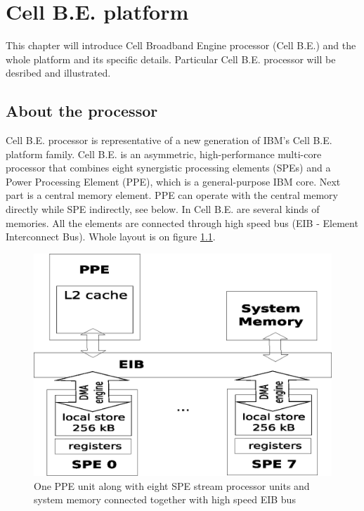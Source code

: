 \chapter{Cell B.E. platform}

This chapter will introduce Cell Broadband Engine processor (Cell B.E.) and the whole platform and its specific details.
Particular Cell B.E. processor will be desribed and illustrated.

\section{About the processor}

Cell B.E. processor is representative of a new generation of IBM's Cell B.E. platform family.
Cell B.E. is an asymmetric, high-performance multi-core processor that combines eight synergistic processing elements (SPEs) and a Power Processing Element (PPE), which is a general-purpose IBM  core.
Next part is a central memory element.
PPE can operate with the central memory directly while SPE indirectly, see below.
In Cell B.E. are several kinds of memories.
All the elements are connected through high speed bus (EIB - Element Interconnect Bus).
Whole layout is on figure \ref{fg:processorLayout}.

\begin{figure}
    \centering
    \includegraphics[width=\textwidth]{data/cellLayout}
    \caption[Cell B.E. processor layout]{One PPE unit along with eight SPE stream processor units and system memory connected together with high speed EIB bus}
    \label{fg:processorLayout}
\end{figure}

